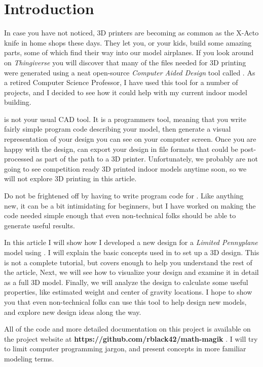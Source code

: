 \section{Introduction}

In case you have not noticed, 3D printers are becoming as common as the X-Acto
knife in home shops these days. They let you, or your kids, build some amazing
parts, some of which find their way into our model airplanes. If you look
around on {\it Thingiverse} \cite{thingy} you will discover that many of the
files needed for 3D printing were generated using a neat open-source {\it
Computer Aided Design} tool called \osc. As a retired Computer
Science Professor, I have used this tool for a number of projects, and I
decided to see how it could help with my current indoor model building.

\osc is not your usual CAD tool. It is a programmers tool, meaning that you
write fairly simple program code describing your model, then generate a visual
representation of your design you can see on your computer screen. Once you are
happy with the design, \osc can export your design in file formats that could be
post-processed as part of the path to a 3D printer. Unfortunately, we probably are
not going to see competition ready 3D printed indoor models anytime soon, so we will
not explore 3D printing in this article.

Do not be frightened off by having to write program code for \osc. Like
anything new, it can be a bit intimidating for beginners, but I have worked on
making the code needed simple enough that even non-technical
folks should be able to generate useful results.

In this article I will show how I developed a new design for a {\it Limited
Pennyplane} model using \osc. I will explain the basic concepts used in \osc
to set up a 3D design. This is not a complete tutorial, but covers enough to
help you understand the rest of the article, Next, we will see how to visualize
your design and examine it in detail as a full 3D model. Finally, we will
analyze the design to calculate some useful properties, like estimated weight
and center of gravity locations. I hope to show you that even non-technical
folks can use this tool to help design new models, and explore new design ideas
along the way.

All of the code and more detailed documentation on this project is available on
the project website at {\bf https://github.com/rblack42/math-magik}
\cite{blackr}. I will try to limit computer programming jargon, and present
concepts in more familiar modeling terms.



